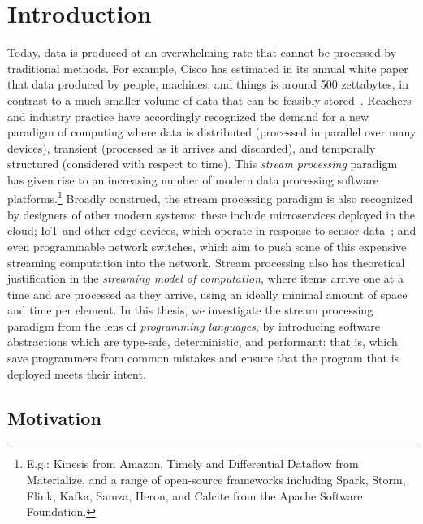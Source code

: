 \section{Introduction}
\label{sec:intro}

Today, data is produced at an overwhelming rate
that cannot be processed by traditional methods.
For example, Cisco has estimated in its annual white paper
that data produced by people, machines, and things
is around 500 zettabytes, in contrast to a much smaller volume
of data that can be feasibly stored~\cite{index2018forecast}.
Reachers and industry practice have accordingly recognized the demand
for a new paradigm of computing where data is
distributed (processed in parallel over many devices),
transient (processed as it arrives and discarded),
and temporally structured (considered with respect to time).
This \emph{stream processing} paradigm has given rise to an increasing number
of modern data processing software platforms.\footnote{E.g.: Kinesis from Amazon, Timely and Differential Dataflow from Materialize, and a range of open-source frameworks including Spark, Storm, Flink, Kafka, Samza, Heron, and Calcite from the Apache Software Foundation.}
Broadly construed, the stream processing paradigm is also recognized by designers of other modern systems: these include microservices deployed in the cloud; IoT and other edge devices, which operate in response
to sensor data~\cite{shi2016edge, ashton2009internet}; and even programmable network switches,
which aim to push some of this expensive streaming computation
into the network.
Stream processing also has theoretical justification in the \emph{streaming model of computation},
where items arrive one at a time and are processed as they arrive, using
an ideally minimal amount of space and time per element.
In this thesis, we investigate the stream processing paradigm from the lens of \emph{programming languages}, by introducing software abstractions which are type-safe, deterministic, and performant: that is, which save programmers from common mistakes and ensure that the program that is deployed meets their intent.

\subsection{Motivation}

